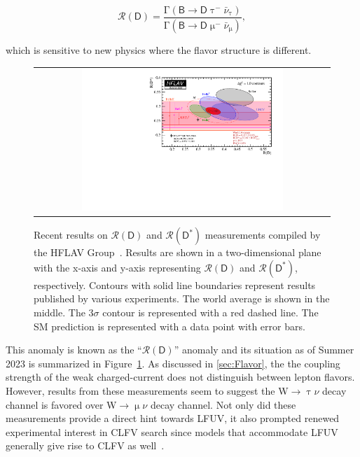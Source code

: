 \begin{equation}
\mathcal{R}(\textsf{D})=\frac{\mathrm{\Gamma}(\textsf{B}\rightarrow\textsf{D}\uptau^{-}\bar{\nu}_{\uptau})}{\mathrm{\Gamma}(\textsf{B}\rightarrow\textsf{D}\upmu^{-}\bar{\nu}_{\upmu})},
\end{equation}

which is sensitive to new physics where the flavor structure is different.

\begin{figure}[tbh!]
 \begin{center}
 \begin{tabular}{c}
 \includegraphics[width=0.7\textwidth]{figures/Part1/BSM/RD}
 \end{tabular}
 \caption{Recent results on $\mathcal{R}(\textsf{D})$ and $\mathcal{R}(\textsf{D}^{*})$ measurements compiled by the HFLAV Group~\cite{HFLAV}. Results are shown in a two-dimensional plane with the x-axis and y-axis representing $\mathcal{R}(\textsf{D})$ and $\mathcal{R}(\textsf{D}^{*})$, respectively. Contours with solid line boundaries represent results published by various experiments. The world average is shown in the middle. The 3$\sigma$ contour is represented with a red dashed line. The \ac{SM} prediction is represented with a data point with error bars.}
 \label{fig:RD}
 \end{center}
\end{figure}

This anomaly is known as the ``$\mathcal{R}(\textsf{D})$'' anomaly and its situation as of Summer 2023 is summarized in Figure~\ref{fig:RD}. As discussed in \autoref{sec:Flavor}, the the coupling strength of the weak charged-current does not distinguish between lepton flavors. However, results from these measurements seem to suggest the W$\rightarrow\uptau\nu$ decay channel is favored over W$\rightarrow\upmu\nu$ decay channel. Not only did these measurements provide a direct hint towards \ac{LFUV}, it also prompted renewed experimental interest in \ac{CLFV} search since models that accommodate \ac{LFUV} generally give rise to \ac{CLFV} as well~\cite{Glashow:2014iga}. 


